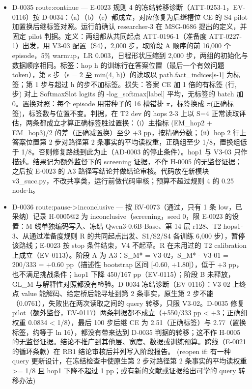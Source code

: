 \documentclass[11pt]{article}
\begin{document}
\begin{itemize}
\item D-0035 route:continue --- E-0023 规则 4 的冻结转移诊断（ATT-0253-1，EV-0116）按 D-0034：（a）（b）（c）都成立，对应修复为后继槽位 CE 的 S4 pilot 加置换后继标签对照。运行前确认 researcher-3 在 MSG-0686 提出的定义，并固定 pilot 判据。定义：两组都从共同起点 ATT-0196-1（准备度 ATT-0227-1）出发，用 V3-03 配置（S4），2,000 步，取阶段 A 顺序的前 16,000 个 episode，5\% warmup，LR 0.003，日程形状压缩到 2,000 步，两组的初始化与数据顺序相同。标签：hop h 的训练行在答案位置（最后一个有效问题 token），第 s 步（s = 2 至 min(4, h)）的读取以 path.fact\_indices[s-1] 为标签；第 1 步与超过 h 的步不加标签。损失：答案 CE 加 1 倍的有标签 (行, 步) 对上 SoftmaxSlot logits 的 -log\_softmax[label] 平均，无标签的 batch 加 0。置换对照：每个 episode 用带种子的 16 槽错排 \ensuremath{\pi}，标签换成 \ensuremath{\pi}(正确标签)，标签数与位置不变。判据，在 T2 dev 的 hops 2-3 上以 S=4 正常读取评估，两条都成立才算正确标签胜过置换：（i）主指标 (EM\_hop2 + EM\_hop3)/2 的差（正确减置换）至少 +3 pp，按精确分数；（ii）hop 2 行上答案位置第 2 步对路径第 2 条事实的平均读权重，正确组至少 1/8，置换组低于 1/8。否则修复路线到此为止（AD-0003 的停止条件）。hop1 与 V3-03 只作描述。结果记为额外监督下的 screening 证据，不作 H-0005 的无监督证据；之后按 E-0023 的 A3 路径写结论并做结论审核。代码放在新模块 v3\_succ.py，不改共享类，运行前做代码审核；预算不超过规则 4 的 0.25 node\ensuremath{\cdot}h。
\item D-0036 route:pause-\textgreater{}inconclusive --- 按 RV-0073（通过，只有 1 条 low，已采纳）记录 H-0005@2 为 inconclusive（screening，seed 0，限 E-0023 的设置：M 线单独编码写入、冻结 Qwen3-0.6B-Base、第 14 层 r128、T2 hops1-3、从通过准备度规则 R 的共同起点出发、S1/S2/S4 各训练 6,000 步），暂停该路线；E-0023 按 stop 条件结束，V4 不起草。R 在未用过的 T2 calibration 上成立（EV-0113）。阶段 A 为 A3：S\_M* = V3-02，S\_M* - V3-01 = 200/333 = +0.60 pp（描述性 bootstrap 区间 [-0.60, +1.80]），低于 +3 pp，也不满足挑战条件；hop1 下降 450/167 pp（EV-0115）；阶段 B 未释放，GL\_M 与解释性对照都没有检验。D-0034 冻结诊断（EV-0116）：V3-02 上终点 value 能解码、给定桥后能寻址到第 2 条事实，原生第 2 步不能（0.0761），失败出在两次读取之间的 query 转移，只限 V3-02。D-0035 修复 pilot（额外监督，EV-0117）两条判据都不成立（+550/333 pp \textless{} +3；正确组权重 0.0834 \textless{} 1/8），最后 100 步后继 CE 为 2.51（正确标签）与 2.77（置换标签，约等于 ln 16），都没有带来达到 D-0035 判据的转移；这不作 H-0005 的无监督证据。结论不推广到其他层、宽度、数据或训练预算。跨线（E-0021 的循环条款）在 RB1 结论审核后并列写入阶段报告。 (reopen if: 有一种 query 更新设计，在冻结检查中使原生第 2 步对路径第 2 条事实的平均读权重 \textgreater{}= 1/8 且 hop1 下降不超过 1 pp；或有新的文献或证据给出可学的 query 转移办法)

\end{itemize}
\end{document}
